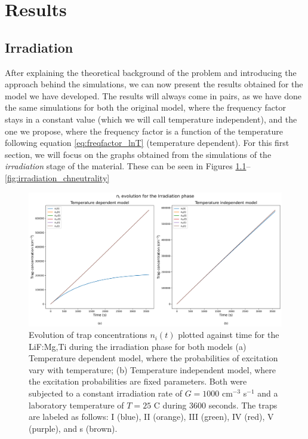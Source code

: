 \chapter{Results}


\section{Irradiation}

After explaining the theoretical background of the problem and introducing the approach behind the simulations, we can now present the results obtained for the model we have developed. The results will always come in pairs, as we have done the same simulations for both the original model, where the frequency factor stays in a constant value (which we will call temperature independent), and the one we propose, where the frequency factor is a function of the temperature following equation \ref{eq:freqfactor_lnT} (temperature dependent). For this first section, we will focus on the graphs obtained from the simulations of the \textit{irradiation} stage of the material. These can be seen in Figures \ref{fig:irradiation_nievolution}-- \ref{fig:irradiation_chneutrality}

\begin{figure}
    \centering
    \includegraphics[width=\textwidth]{Images/Irradiation n_i evolution.png}
    \caption[Trap occupancy evolution during the irradiation phase for both models.]{Evolution of trap concentrations $n_i(t)$  plotted against time for the LiF:Mg,Ti during the irradiation phase for both models (a) Temperature dependent model, where the probabilities of excitation vary with temperature; (b) Temperature independent model, where the excitation probabilities are fixed parameters. Both were subjected to a constant irradiation rate of $G = 1000$ cm$^{-3}$ s$^{-1}$ and a laboratory temperature of $T = 25$ \textdegree C during 3600 seconds. The traps are labeled as follows: I (blue), II (orange), III (green), IV (red), V (purple), and s (brown).}
    \label{fig:irradiation_nievolution}
\end{figure}

